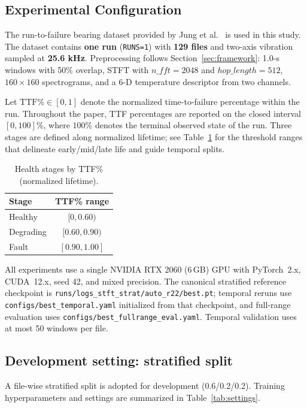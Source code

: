 \documentclass[pdflatex,sn-mathphys-num]{sn-jnl}%
\begin{document}
\subsection{Experimental Configuration}
The run-to-failure bearing dataset provided by Jung et al.~\cite{jung2024dib_rtf,jung2024mendeley_rtf} is used in this study. The dataset contains \textbf{one run} (\texttt{RUNS=1}) with \textbf{129 files} and two-axis vibration sampled at \textbf{25.6 kHz}. Preprocessing follows Section~\ref{sec:framework}: 1.0-s windows with 50\% overlap, STFT with $n\_fft=2048$ and $hop\_length=512$, $160\times160$ spectrograms, and a 6-D temperature descriptor from two channels.

Let $\mathrm{TTF\%} \in [0,1]$ denote the normalized time-to-failure percentage within the run. Throughout the paper, TTF percentages are reported on the closed interval $[0,100]\%$, where $100\%$ denotes the terminal observed state of the run.
Three stages are defined along normalized lifetime; see Table~\ref{tab:stages} for the threshold ranges that delineate early/mid/late life and guide temporal splits.
\begin{table}[htbp]
  \centering
  \caption{Health stages by TTF\% (normalized lifetime).}
  \label{tab:stages}
  \begin{tabular}{lc}
    \toprule
    Stage & TTF\% range \\
    \midrule
    Healthy & $[0,0.60)$ \\
    Degrading & $[0.60,0.90)$ \\
    Fault & $[0.90,1.00]$ \\
    \bottomrule
  \end{tabular}
\end{table}

All experiments use a single NVIDIA RTX 2060 (6\,GB) GPU with PyTorch~2.x, CUDA~12.x, seed 42, and mixed precision. The canonical stratified reference checkpoint is \nolinkurl{runs/logs_stft_strat/auto_r22/best.pt}; temporal reruns use \nolinkurl{configs/best_temporal.yaml} initialized from that checkpoint, and full-range evaluation uses \nolinkurl{configs/best_fullrange_eval.yaml}. Temporal validation uses at most 50 windows per file.

\subsection{Development setting: stratified split}
A file-wise stratified split is adopted for development (0.6/0.2/0.2). Training hyperparameters and settings are summarized in Table~\ref{tab:settings}.
\end{document}

